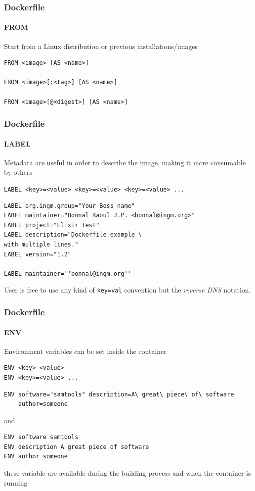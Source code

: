 \begin{frame}[fragile]
\frametitle{Dockerfile}
\framesubtitle{FROM}

Start from a Linux distribution or previous installations/images

\begin{lstlisting}
FROM <image> [AS <name>]

FROM <image>[:<tag>] [AS <name>]

FROM <image>[@<digest>] [AS <name>]
\end{lstlisting}
\end{frame}

\begin{frame}[fragile]
\frametitle{Dockerfile}
\framesubtitle{LABEL}

Metadata are useful in order to describe the image, making it more consumable by others

\lstinline!LABEL <key>=<value> <key>=<value> <key>=<value> ...!

\begin{lstlisting}
LABEL org.ingm.group="Your Boss name"
LABEL maintainer="Bonnal Raoul J.P. <bonnal@ingm.org>"
LABEL project="Elixir Test"
LABEL description="Dockerfile example \
with multiple lines."
LABEL version="1.2"
 
LABEL maintainer=''bonnal@ingm.org''
\end{lstlisting}

User is free to use any kind of \lstinline!key=val! convention but the \textit{reverse DNS} notation.
\end{frame}

\begin{frame}[fragile]
\frametitle{Dockerfile}
\framesubtitle{ENV}

Environment variables can be set inside the container

\begin{lstlisting}
ENV <key> <value>
ENV <key>=<value> ...
\end{lstlisting}

\begin{lstlisting}[breaklines=true]
ENV software="samtools" description=A\ great\ piece\ of\ software
    author=someone
\end{lstlisting}	
and
	
\begin{lstlisting}
ENV software samtools
ENV description A great piece of software
ENV author someone
\end{lstlisting}

these variable are available during the building process and when the container is running
\end{frame}

